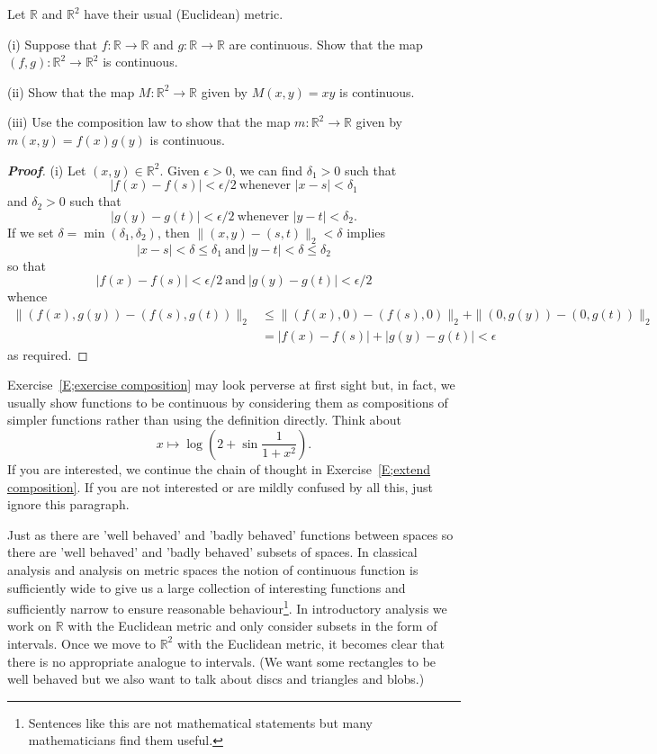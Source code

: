 \begin{theorem}\label{E;exercise composition}
Let ${\mathbb R}$ and ${\mathbb R}^{2}$ have their usual (Euclidean) metric.

(i) Suppose that $f:{\mathbb R}\rightarrow{\mathbb R}$ and
$g:{\mathbb R}\rightarrow{\mathbb R}$ are continuous. Show that
the map $(f,g):{\mathbb R}^{2}\rightarrow{\mathbb R}^{2}$
is continuous.

(ii) Show that the map $M:{\mathbb R}^{2}\rightarrow{\mathbb R}$
given by $M(x,y)=xy$ is continuous.

(iii) Use the composition law to show that the map
$m:{\mathbb R}^{2}\rightarrow{\mathbb R}$
given by $m(x,y)=f(x)g(y)$ is continuous.
\end{theorem}
\begin{proof}[\bf Proof] (i) Let $(x,y)\in{\mathbb R}^{2}$.
Given $\epsilon>0$, we can find $\delta_{1}>0$ such that
\[|f(x)-f(s)|<\epsilon/2\ \text{whenever $|x-s|<\delta_{1}$}\]
and
$\delta_{2}>0$ such that
\[|g(y)-g(t)|<\epsilon/2\ \text{whenever $|y-t|<\delta_{2}$}.\]
If we set $\delta=\min(\delta_{1},\delta_{2})$, then
$\|(x,y)-(s,t)\|_{2}<\delta$ implies
\[
|x-s|<\delta\leq\delta_{1}
\ \text{and}\ |y-t|<\delta\leq\delta_{2}
\]
so that
\[|f(x)-f(s)|<\epsilon/2\ \text{and}\ |g(y)-g(t)|<\epsilon/2\]
whence
\begin{align*}
\|(f(x),g(y))-(f(s),g(t))\|_{2}
&\leq \|(f(x),0)-(f(s),0)\|_{2}+\|(0,g(y))-(0,g(t))\|_{2}\\
&=|f(x)-f(s)|+|g(y)-g(t)|<\epsilon
\end{align*}
as required.
\end{proof}


Exercise~\ref{E;exercise composition} may look perverse
at first sight but, in fact, we usually show functions
to be continuous by considering them as compositions
of simpler functions rather than using the definition directly.
Think about
\[x\mapsto \log\left(2+\sin\frac{1}{1+x^{2}}\right).\]
If you are interested, we continue the chain of thought
in Exercise~\ref{E;extend composition}. If you are not interested
or are mildly confused by all this,
just ignore this paragraph.

Just as there are 'well behaved' and 'badly behaved' functions
between spaces
so there are 'well behaved' and 'badly behaved' subsets
of spaces. In classical analysis and analysis on metric spaces
the notion of continuous function is sufficiently wide
to give us a large collection of interesting functions
and sufficiently narrow to ensure reasonable
behaviour\footnote{Sentences like this are not mathematical
statements but many mathematicians find them useful.}.
In introductory analysis we work on ${\mathbb R}$ with
the Euclidean metric and only consider subsets in the
form of intervals. Once we move to ${\mathbb R}^{2}$ with
the Euclidean metric, it becomes clear that there is
no appropriate analogue to intervals. (We want some rectangles
to be well behaved but we also want to talk about discs and
triangles and blobs.)

